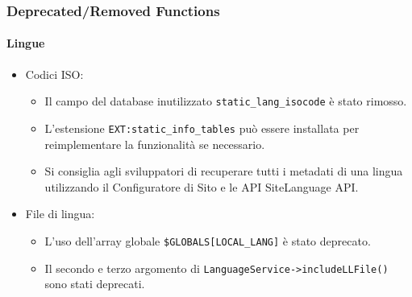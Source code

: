 \begin{frame}[fragile]
	\frametitle{Deprecated/Removed Functions}
	\framesubtitle{Lingue}

	\begin{itemize}
		\item Codici ISO:

			\begin{itemize}
				\item Il campo del database inutilizzato \texttt{static\_lang\_isocode} è stato rimosso.
				\item L'estensione \texttt{EXT:static\_info\_tables} può essere installata per reimplementare la funzionalità se necessario.
				\item Si consiglia agli sviluppatori di recuperare tutti i metadati di una lingua utilizzando il Configuratore di Sito e le API SiteLanguage API.
			\end{itemize}

		\item File di lingua:

			\begin{itemize}
				\item L'uso dell'array globale \texttt{\$GLOBALS[LOCAL\_LANG]} è stato deprecato.
				\item Il secondo e terzo argomento di \texttt{LanguageService->includeLLFile()} sono stati deprecati.
			\end{itemize}

	\end{itemize}

\end{frame}


